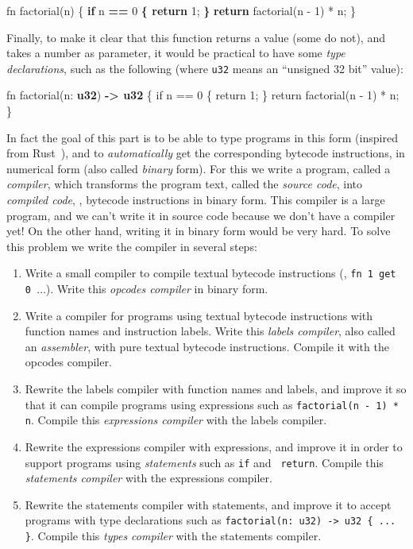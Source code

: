 \begin{Code}
fn factorial(n) \{
  \textbf{if} n \textbf{==} 0 \textbf{\{ return} 1; \textbf{\}}
  \textbf{return} factorial(n - 1) * n;
\}
\end{Code}

Finally, to make it clear that this function returns a value (some do not), and
takes a number as parameter, it would be practical to have some {\em type
declarations}, such as the following (where \verb!u32! means an ``unsigned 32
bit'' value):

\begin{Code}
fn factorial(n: \textbf{u32}) \textbf{-> u32} \{
  if n == 0 \{ return 1; \}
  return factorial(n - 1) * n;
\}
\end{Code}

In fact the goal of this part is to be able to type programs in this form
(inspired from Rust~\cite{RustProgrammingLanguage}), and to {\em automatically}
get the corresponding bytecode instructions, in numerical form (also called
{\em binary} form). For this we write a program, called a {\em compiler}, which
transforms the program text, called the {\em source code}, into {\em compiled
code}, \ie, bytecode instructions in binary form. This compiler is a large
program, and we can't write it in source code because we don't have a compiler
yet! On the other hand, writing it in binary form would be very hard. To solve
this problem we write the compiler in several steps:

\begin{enumerate}
\item Write a small compiler to compile textual bytecode instructions (\eg,
{\tt fn 1 get 0 $\ldots$}). Write this {\em opcodes compiler} in binary form.

\item Write a compiler for programs using textual bytecode instructions with
function names and instruction labels. Write this {\em labels compiler}, also
called an {\em assembler}, with pure textual bytecode instructions. Compile it
with the opcodes compiler.

\item Rewrite the labels compiler with function names and labels, and improve
it so that it can compile programs using expressions such as {\tt factorial(n -
1) * n}. Compile this {\em expressions compiler} with the labels compiler.

\item Rewrite the expressions compiler with expressions, and improve it in
order to support programs using {\em statements} such as {\tt if} and {\tt
return}. Compile this {\em statements compiler} with the expressions compiler.

\item Rewrite the statements compiler with statements, and improve it to accept
programs with type declarations such as {\tt factorial(n: u32) -> u32 \{ ...
\}}. Compile this {\em types compiler} with the statements compiler.
\end{enumerate}

